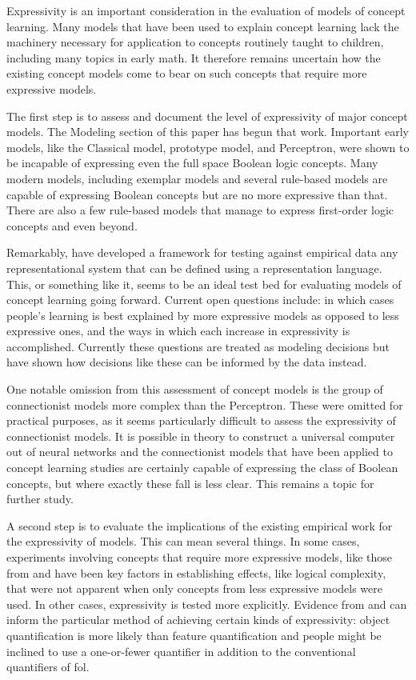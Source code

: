 \documentclass[doc,floatsintext]{apa6}
\begin{document}
Expressivity is an important consideration in the evaluation of models of concept learning.
Many models that have been used to explain concept learning lack the machinery necessary for application to concepts routinely taught to children, including many topics in early math.
It therefore remains uncertain how the existing concept models come to bear on such concepts that require more expressive models.

The first step is to assess and document the level of expressivity of major concept models. The Modeling section of this paper has begun that work. Important early models, like the Classical model, prototype model, and Perceptron, were shown to be incapable of expressing even the full space Boolean logic concepts.
Many modern models, including exemplar models and several rule-based models are capable of expressing Boolean concepts but are no more expressive than that.
There are also a few rule-based models that manage to express first-order logic concepts and even beyond.

Remarkably, \citet{piantadositg2015} have developed a framework for testing against empirical data any representational system that can be defined using a representation language.
This, or something like it, seems to be an ideal test bed for evaluating models of concept learning going forward.
Current open questions include: in which cases people's learning is best explained by more expressive models as opposed to less expressive ones, and the ways in which each increase in expressivity is accomplished.
Currently these questions are treated as modeling decisions but \citeauthor{piantadositg2015} have shown how decisions like these can be informed by the data instead.

One notable omission from this assessment of concept models is the group of connectionist models more complex than the Perceptron.
These were omitted for practical purposes, as it seems particularly difficult to assess the expressivity of connectionist models.
It is possible in theory to construct a universal computer out of neural networks \citep{siegelmanns1991} and the connectionist models that have been applied to concept learning studies \citep{kruschke1992,lovemg2004} are certainly capable of expressing the class of Boolean concepts, but where exactly these fall is less clear. This remains a topic for further study.

A second step is to evaluate the implications of the existing empirical work for the expressivity of models.
This can mean several things.
In some cases, experiments involving concepts that require more expressive models, like those from \citet{shepardhj1961} and \citet{feldman2000} have been key factors in establishing effects, like logical complexity, that were not apparent when only concepts from less expressive models were used.
In other cases, expressivity is tested more explicitly.
Evidence from \citet{kemp2012} and \citet{piantadositg2015} can inform the particular method of achieving certain kinds of expressivity: object quantification is more likely than feature quantification and people might be inclined to use a one-or-fewer quantifier in addition to the conventional quantifiers of \ac{fol}.
\end{document}
